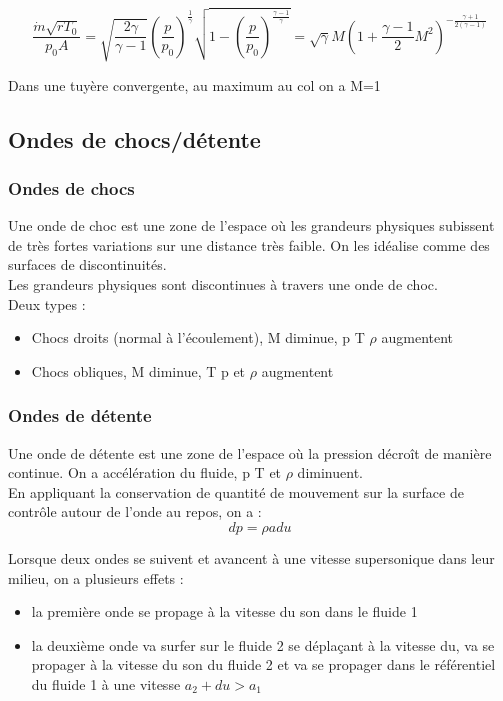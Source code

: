 \documentclass[../main.tex]{subfiles}
\begin{document}
\begin{equation}
    \frac{\dot{m} \sqrt{rT_0}}{p_0 A} = \sqrt{\frac{2\gamma}{\gamma-1}} (\frac{p}{p_0})^{\frac{1}{\gamma}} \sqrt{1-(\frac{p}{p_0})^{\frac{\gamma-1}{\gamma}}} = \sqrt{\gamma} M (1+\frac{\gamma-1}{2}M^2)^{-\frac{\gamma+1}{2(\gamma-1)}}
\end{equation}

Dans une tuyère convergente, au maximum au col on a M=1\\

\subsection{Ondes de chocs/détente}
\subsubsection{Ondes de chocs}
Une onde de choc est une zone de l'espace où les grandeurs physiques subissent de très fortes variations sur une distance très faible. On les idéalise comme des surfaces de discontinuités. \\
\warning Les grandeurs physiques sont discontinues à travers une onde de choc.\\
Deux types : \begin{itemize}
    \item Chocs droits (normal à l'écoulement), M diminue, p T $\rho$ augmentent\\
    \item Chocs obliques, M diminue, T p et $\rho$ augmentent\\
\end{itemize}

\subsubsection{Ondes de détente}
Une onde de détente est une zone de l'espace où la pression décroît de manière continue. On a accélération du fluide, p T et $\rho$ diminuent.\\

En appliquant la conservation de quantité de mouvement sur la surface de contrôle autour de l'onde au repos, on a : \begin{equation}
    dp = \rho a du
\end{equation}

Lorsque deux ondes se suivent et avancent à une vitesse supersonique dans leur milieu, on a plusieurs effets : \begin{itemize}
    \item la première onde se propage à la vitesse du son dans le fluide 1\\
    \item la deuxième onde va surfer sur le fluide 2 se déplaçant à la vitesse du, va se propager à la vitesse du son du fluide 2 et va se propager dans le référentiel du fluide 1 à une vitesse $a_2 + du >a_1$\\
\end{itemize}
\end{document}
